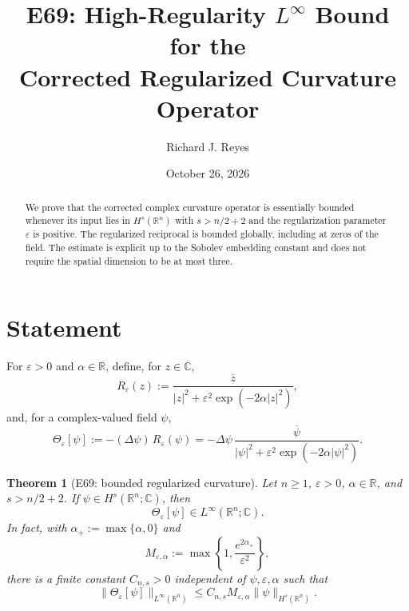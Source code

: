 \documentclass[11pt]{article}
\title{E69: High-Regularity $L^\infty$ Bound for the\\Corrected Regularized Curvature Operator}
\author{Richard J. Reyes}
\date{October 26, 2026}
\newtheorem{theorem}{Theorem}
\newcommand{\R}{\mathbb{R}}
\newcommand{\C}{\mathbb{C}}
\newcommand{\eps}{\varepsilon}
\begin{document}
\maketitle

\begin{abstract}
We prove that the corrected complex curvature operator is essentially bounded
whenever its input lies in $H^s(\R^n)$ with $s>n/2+2$ and the regularization
parameter $\eps$ is positive. The regularized reciprocal is bounded globally,
including at zeros of the field. The estimate is explicit up to the Sobolev
embedding constant and does not require the spatial dimension to be at most three.
\end{abstract}

\section{Statement}

For $\eps>0$ and $\alpha\in\R$, define, for $z\in\C$,
\begin{equation}\label{eq:reciprocal}
 R_\eps(z)
 := \frac{\overline z}{|z|^2+\eps^2\exp(-2\alpha|z|^2)},
\end{equation}
and, for a complex-valued field $\psi$,
\begin{equation}\label{eq:curvature}
 \Theta_\eps[\psi]
 := - (\Delta\psi)\,R_\eps(\psi)
 = -\Delta\psi\,
 \frac{\overline\psi}{|\psi|^2+\eps^2\exp(-2\alpha|\psi|^2)}.
\end{equation}

\begin{theorem}[E69: bounded regularized curvature]\label{thm:e69}
Let $n\ge1$, $\eps>0$, $\alpha\in\R$, and $s>n/2+2$.
If $\psi\in H^s(\R^n;\C)$, then
\[
 \Theta_\eps[\psi]\in L^\infty(\R^n;\C).
\]
In fact, with $\alpha_+:=\max\{\alpha,0\}$ and
\begin{equation}\label{eq:M}
 M_{\eps,\alpha}
 :=\max\left\{1,\frac{e^{2\alpha_+}}{\eps^2}\right\},
\end{equation}
there is a finite constant $C_{n,s}>0$ independent of
$\psi,\eps,\alpha$ such that
\begin{equation}\label{eq:main}
 \boxed{\quad
 \|\Theta_\eps[\psi]\|_{L^\infty(\R^n)}
 \le C_{n,s}M_{\eps,\alpha}\|\psi\|_{H^s(\R^n)}.
 \quad}
\end{equation}
\end{theorem}
\end{document}
